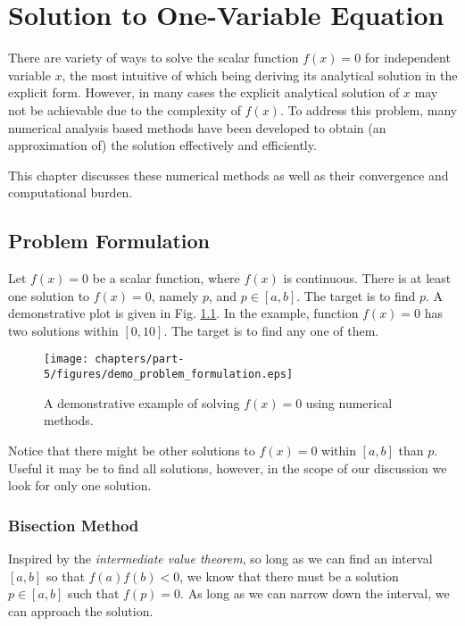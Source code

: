 \chapter{Solution to One-Variable Equation}

There are variety of ways to solve the scalar function $f(x)=0$ for independent variable $x$, the most intuitive of which being deriving its analytical solution in the explicit form. However, in many cases the explicit analytical solution of $x$ may not be achievable due to the complexity of $f(x)$. To address this problem, many numerical analysis based methods have been developed to obtain (an approximation of) the solution effectively and efficiently.

This chapter discusses these numerical methods as well as their convergence and computational burden. 

\section{Problem Formulation}

Let $f(x)=0$ be a scalar function, where $f(x)$ is continuous. There is at least one solution to $f(x)=0$, namely $p$, and $p\in \left[a, b\right]$. The target is to find $p$. A demonstrative plot is given in Fig. \ref{fig:part-5:onevarproblemformulation}. In the example, function $f(x)=0$ has two solutions within $\left[0, 10\right]$. The target is to find any one of them.

\begin{figure}[htbp]
\centering
\texttt{[image: chapters/part-5/figures/demo\_problem\_formulation.eps]}
\caption{A demonstrative example of solving $f(x)=0$ using numerical methods.} \label{fig:part-5:onevarproblemformulation}
\end{figure} 

Notice that there might be other solutions to $f(x)=0$ within $\left[a, b\right]$ than $p$. Useful it may be to find all solutions, however, in the scope of our discussion we look for only one solution. 

\subsection{Bisection Method}

Inspired by the \textit{intermediate value theorem}, so long as we can find an interval $\left[a, b\right]$ so that $f(a)f(b)<0$, we know that there must be a solution $p\in\left[a, b\right]$ such that $f(p)=0$. As long as we can narrow down the interval, we can approach the solution.

